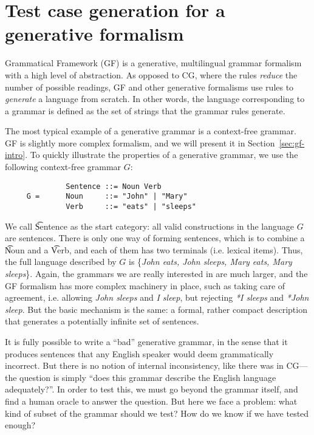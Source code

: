 

\section{Test case generation for a generative formalism}

Grammatical Framework (GF) \cite{ranta2011gfbook} is a generative, multilingual grammar formalism with a high level of abstraction.
As opposed to CG, where the rules \emph{reduce} the number of possible readings, GF and other generative formalisms use rules to \emph{generate} a language from scratch. In other words, the language corresponding to a grammar is defined as the set of strings that the grammar rules generate.

The most typical example of a generative grammar is a context-free grammar. GF is slightly more complex formalism, and we will present it in Section~\ref{sec:gf-intro}. To quickly illustrate the properties of a generative grammar, we use the following context-free grammar $G$:

\begin{verbatim}
              Sentence ::= Noun Verb
     G =      Noun     ::= "John" | "Mary"
              Verb     ::= "eats" | "sleeps"
\end{verbatim}

We call \t{Sentence} as the start category: all valid constructions in the language $G$ are sentences. There is only one way of forming sentences, which is to combine a \t{Noun} and a \t{Verb}, and each of them has two terminals (i.e. lexical items). Thus, the full language described by $G$ is \{\emph{John eats, John sleeps, Mary eats, Mary sleeps}\}. Again, the grammars we are really interested in are much larger, and the GF formalism has more complex machinery in place, such as taking care of agreement, i.e. allowing \emph{John sleeps} and \emph{I sleep}, but rejecting \emph{*I sleeps} and \emph{*John sleep}. But the basic mechanism is the same: a formal, rather compact description that generates a potentially infinite set of sentences.

It is fully possible to write a ``bad'' generative grammar, in the sense that it produces sentences that any English speaker would deem grammatically incorrect. But there is no notion of internal inconsistency, like there was in CG---the question is simply ``does this grammar describe the English language adequately?''.
In order to test this, we must go beyond the grammar itself, and find a human oracle to answer the question.
But here we face a problem: what kind of subset of the grammar should we test? How do we know if we have tested enough?

